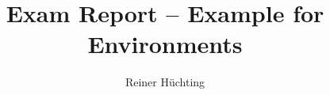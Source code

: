 \documentclass[a4paper]{scrartcl}
\begin{document}
    \title{Exam Report -- Example for Environments}
    \author{Reiner Hüchting}

    \maketitle


    \insertexamreport[submissions][submission2][task2]
\end{document}

